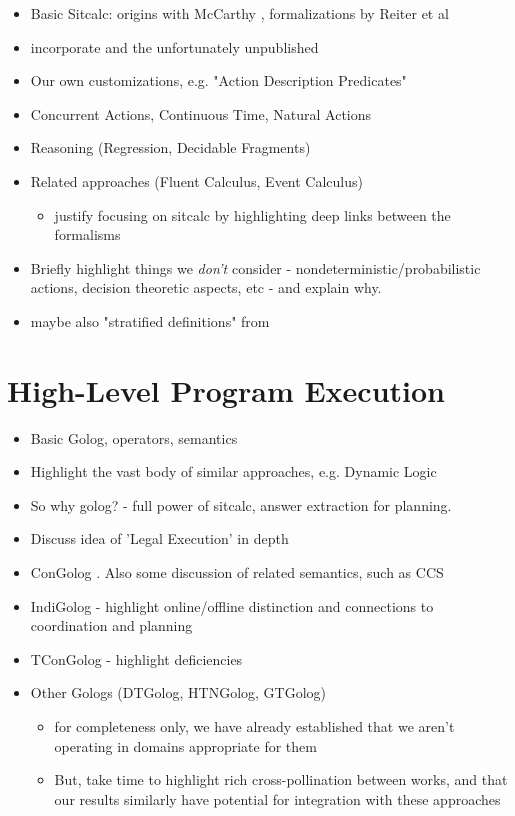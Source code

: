\begin{itemize}
\item Basic Sitcalc: origins with McCarthy \cite{McCHay69sitcalc}, formalizations by Reiter et al \cite{reiter01kia,pirri99contributions_sitcalc,levesque98sc_foundations}
\item incorporate \cite{pinto99ramification,pinto98interacting_effects} and the unfortunately unpublished \cite{pinto00action_interaction}
\item Our own customizations, e.g. "Action Description Predicates" \cite{kelly07sc_persistence}
\item Concurrent Actions, Continuous Time, Natural Actions \cite{pinto94temporal,reiter96sc_nat_conc}
\item Reasoning (Regression, Decidable Fragments)
\item Related approaches (Fluent Calculus, Event Calculus)
  \begin{itemize}
  \item justify focusing on sitcalc by highlighting deep links between the formalisms
  \end{itemize}
\item Briefly highlight things we \emph{don't} consider - nondeterministic/probabilistic actions, decision theoretic aspects, etc - and explain why.
\item maybe also "stratified definitions" from \cite{pinto94temporal}
\end{itemize}

\section{High-Level Program Execution}

\begin{itemize}
\item Basic Golog, operators, semantics \cite{levesque97golog}
\item Highlight the vast body of similar approaches, e.g. Dynamic Logic
\item So why golog? - full power of sitcalc, answer extraction for planning.
\item Discuss idea of 'Legal Execution' in depth
\item ConGolog \cite{giacomo00congolog}.  Also some discussion of related
semantics, such as CCS 
\item IndiGolog - highlight online/offline distinction and connections to coordination and planning \cite{giacomo99indigolog}
\item TConGolog - highlight deficiencies \cite{pinto99tcongolog}
\item Other Gologs (DTGolog, HTNGolog, GTGolog)
  \begin{itemize}
  \item for completeness only, we have already established that we aren't operating in domains appropriate for them
  \item But, take time to highlight rich cross-pollination between works, and that our results similarly have potential for integration with these approaches
  \end{itemize}
\end{itemize}

